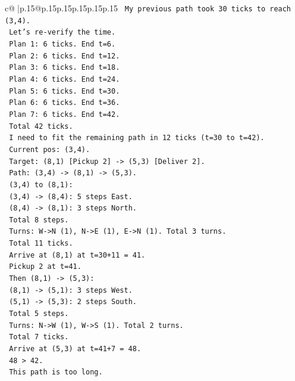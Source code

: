\documentclass{article}
\begin{document}
{\begin{supertabular}{c@{$\;$}|p{.15\linewidth}@{}p{.15\linewidth}p{.15\linewidth}p{.15\linewidth}p{.15\linewidth}p{.15\linewidth}}
{{{\texttt{   My previous path took 30 ticks to reach (3,4).} \\
\texttt{   Let's re{-}verify the time.} \\
\texttt{   Plan 1: 6 ticks. End t=6.} \\
\texttt{   Plan 2: 6 ticks. End t=12.} \\
\texttt{   Plan 3: 6 ticks. End t=18.} \\
\texttt{   Plan 4: 6 ticks. End t=24.} \\
\texttt{   Plan 5: 6 ticks. End t=30.} \\
\texttt{   Plan 6: 6 ticks. End t=36.} \\
\texttt{   Plan 7: 6 ticks. End t=42.} \\
\texttt{   Total 42 ticks.} \\
\texttt{   I need to fit the remaining path in 12 ticks (t=30 to t=42).} \\
\texttt{   Current pos: (3,4).} \\
\texttt{   Target: (8,1) {[}Pickup 2{]} {-}> (5,3) {[}Deliver 2{]}.} \\
\texttt{   Path: (3,4) {-}> (8,1) {-}> (5,3).} \\
\texttt{   (3,4) to (8,1):} \\
\texttt{   (3,4) {-}> (8,4): 5 steps East.} \\
\texttt{   (8,4) {-}> (8,1): 3 steps North.} \\
\texttt{   Total 8 steps.} \\
\texttt{   Turns: W{-}>N (1), N{-}>E (1), E{-}>N (1). Total 3 turns.} \\
\texttt{   Total 11 ticks.} \\
\texttt{   Arrive at (8,1) at t=30+11 = 41.} \\
\texttt{   Pickup 2 at t=41.} \\
\texttt{   Then (8,1) {-}> (5,3):} \\
\texttt{   (8,1) {-}> (5,1): 3 steps West.} \\
\texttt{   (5,1) {-}> (5,3): 2 steps South.} \\
\texttt{   Total 5 steps.} \\
\texttt{   Turns: N{-}>W (1), W{-}>S (1). Total 2 turns.} \\
\texttt{   Total 7 ticks.} \\
\texttt{   Arrive at (5,3) at t=41+7 = 48.} \\
\texttt{   48 > 42.} \\
\texttt{   This path is too long.} \\
}}}
\end{supertabular}}
\end{document}
